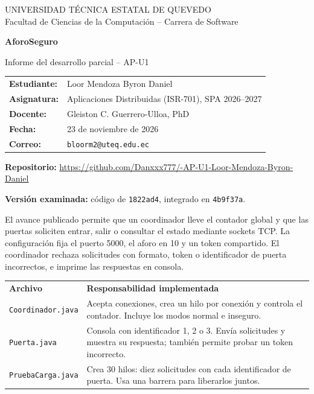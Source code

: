 \documentclass[11pt,a4paper]{article}
\newcommand{\apartado}[1]{\par\vspace{4pt}{\large\bfseries\color{verde}#1}\par\vspace{2pt}}
\begin{document}
\begin{center}
{\small UNIVERSIDAD TÉCNICA ESTATAL DE QUEVEDO\\
Facultad de Ciencias de la Computación -- Carrera de Software}\par
\vspace{5pt}
{\LARGE\bfseries\color{verde} AforoSeguro}\par
{\large Informe del desarrollo parcial -- AP-U1}
\end{center}

\begin{tabularx}{\textwidth}{@{}lY@{}}
\textbf{Estudiante:} & Loor Mendoza Byron Daniel\\
\textbf{Asignatura:} & Aplicaciones Distribuidas (ISR-701), SPA 2026--2027\\
\textbf{Docente:} & Gleiston C. Guerrero-Ulloa, PhD\\
\textbf{Fecha:} & 23 de noviembre de 2026\\
\textbf{Correo:} & \texttt{bloorm2@uteq.edu.ec}
\end{tabularx}

\textbf{Repositorio:} {\small\url{https://github.com/Danxxx777/-AP-U1-Loor-Mendoza-Byron-Daniel}}\par
\textbf{Versión examinada:} código de \texttt{1822ad4}, integrado en \texttt{4b9f37a}.

\apartado{1. Alcance del prototipo}
El avance publicado permite que un coordinador lleve el contador global y que las puertas soliciten entrar, salir o consultar el estado mediante sockets TCP. La configuración fija el puerto 5000, el aforo en 10 y un token compartido. El coordinador rechaza solicitudes con formato, token o identificador de puerta incorrectos, e imprime las respuestas en consola.

\begin{tabularx}{\textwidth}{@{}p{3.5cm}Y@{}}
\textbf{Archivo} & \textbf{Responsabilidad implementada}\\
\texttt{Coordinador.java} & Acepta conexiones, crea un hilo por conexión y controla el contador. Incluye los modos normal e inseguro.\\
\texttt{Puerta.java} & Consola con identificador 1, 2 o 3. Envía solicitudes y muestra su respuesta; también permite probar un token incorrecto.\\
\texttt{PruebaCarga.java} & Crea 30 hilos: diez solicitudes con cada identificador de puerta. Usa una barrera para liberarlos juntos.
\end{tabularx}
\end{document}
